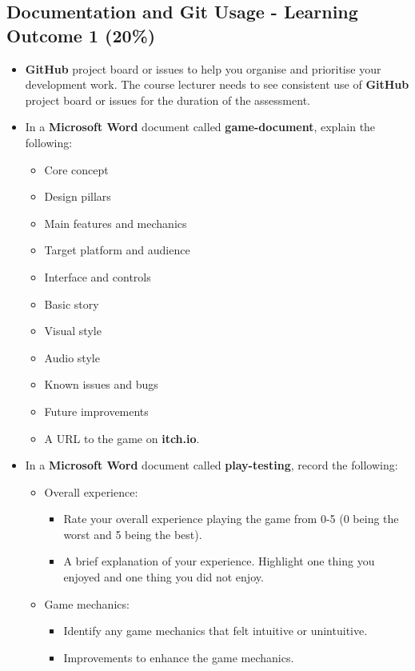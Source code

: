 \documentclass{article}
\begin{document}
\subsection*{Documentation and Git Usage - Learning Outcome 1 (20\%)}
\begin{itemize}
	\item \textbf{GitHub} project board or issues to help you organise and prioritise your development work. The course lecturer needs to see consistent use of \textbf{GitHub} project board or issues for the duration of the assessment.
	\item In a \textbf{Microsoft Word} document called \textbf{game-document}, explain the following:
	\begin{itemize}
		\item Core concept
		\item Design pillars
		\item Main features and mechanics
		\item Target platform and audience
		\item Interface and controls
		\item Basic story
		\item Visual style
		\item Audio style
		\item Known issues and bugs
		\item Future improvements
		\item A URL to the game on \textbf{itch.io}.
	\end{itemize}
	\item In a \textbf{Microsoft Word} document called \textbf{play-testing}, record the following:
	\begin{itemize}
		\item Overall experience:
		\begin{itemize}
			\item Rate your overall experience playing the game from 0-5 (0 being the worst and 5 being the best).
			\item A brief explanation of your experience. Highlight one thing you enjoyed and one thing you did not enjoy.
		\end{itemize}
		\item Game mechanics:
		\begin{itemize}
			\item Identify any game mechanics that felt intuitive or unintuitive.
			\item Improvements to enhance the game mechanics.
		\end{itemize}

\end{itemize}
\end{itemize}
\end{document}

